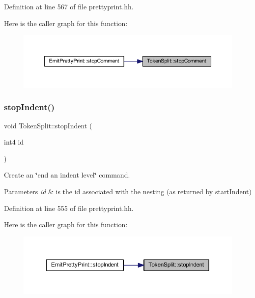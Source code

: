 Definition at line 567 of file prettyprint.\+hh.

Here is the caller graph for this function\+:
\nopagebreak
\begin{figure}[H]
\begin{center}
\leavevmode
\includegraphics[width=350pt]{class_token_split_ac93137757a2cc85219ef8cd5fb994a6c_icgraph}
\end{center}
\end{figure}
\mbox{\label{class_token_split_af12160b7112cf50e7e537c22ddf76860}} 
\subsubsection{\texorpdfstring{stopIndent()}{stopIndent()}}
{\footnotesize\ttfamily void Token\+Split\+::stop\+Indent (\begin{DoxyParamCaption}\item[{int4}]{id }\end{DoxyParamCaption})\hspace{0.3cm}{\ttfamily [inline]}}



Create an \char`\"{}end an indent level\char`\"{} command. 


\begin{DoxyParams}{Parameters}
{\em id} & is the id associated with the nesting (as returned by start\+Indent) \\
\hline
\end{DoxyParams}


Definition at line 555 of file prettyprint.\+hh.

Here is the caller graph for this function\+:
\nopagebreak
\begin{figure}[H]
\begin{center}
\leavevmode
\includegraphics[width=350pt]{class_token_split_af12160b7112cf50e7e537c22ddf76860_icgraph}
\end{center}
\end{figure}
\mbox{\label{class_token_split_a5f1af6fb8cc5fab53f74701885d0d0f6}} 
